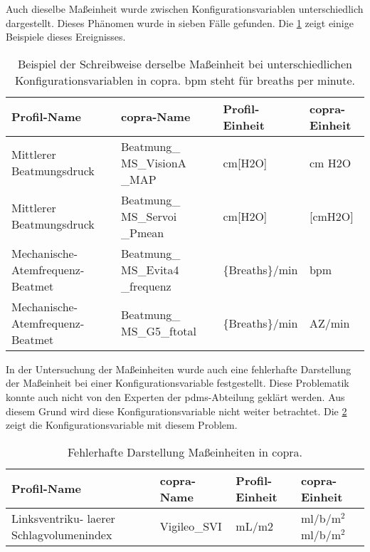 Auch dieselbe Maßeinheit wurde zwischen Konfigurationsvariablen unterschiedlich dargestellt. Dieses Phänomen wurde in sieben Fälle gefunden. Die \ref{tab:unitscopra} zeigt einige Beispiele dieses Ereignisses.

\clearpage

\begin{table}[ht]
	\centering
	\caption[Beispiel der Schreibweise derselbe Maßeinheit in \acs{copra}]{Beispiel der Schreibweise derselbe Maßeinheit bei unterschiedlichen Konfigurationsvariablen in \acs{copra}. bpm steht für \glqq breaths per minute\grqq{}.}
	\label{tab:unitscopra}
	\begin{tabular}{|p{3cm}|p{3cm}|l|l|} \hline
		\bfseries Profil-Name & \bfseries \ac{copra}-Name & \bfseries Profil-Einheit &  \bfseries \ac{copra}-Einheit \\ \hline
		Mittlerer Beatmungsdruck & Beatmung\_ MS\_VisionA \_MAP & cm[H2O] & cm H2O \\ \hline
		Mittlerer Beatmungsdruck & Beatmung\_ MS\_Servoi \_Pmean & cm[H2O] & [cmH2O] \\ \hline \hline
		Mechanische-Atemfrequenz-Beatmet & Beatmung\_ MS\_Evita4 \_frequenz & \{Breaths\}/min & bpm \\ \hline
		Mechanische-Atemfrequenz-Beatmet & Beatmung\_ MS\_G5\_ftotal & \{Breaths\}/min & AZ/min \\ \hline
	\end{tabular}
\end{table}

In der Untersuchung der Maßeinheiten wurde auch eine fehlerhafte Darstellung der Maßeinheit bei einer Konfigurationsvariable festgestellt. Diese Problematik konnte auch nicht von den Experten der \ac{pdms}-Abteilung geklärt werden. Aus diesem Grund wird diese Konfigurationsvariable nicht weiter betrachtet. Die \ref{tab:errounit} zeigt die Konfigurationsvariable mit diesem Problem.


\begin{table}[ht]
	\centering
	\caption[Fehlerhafte Darstellung Maßeinheiten in \acs{copra}]{Fehlerhafte Darstellung Maßeinheiten in \acs{copra}.}
	\label{tab:errounit}
	\begin{tabular}{|p{3cm}|p{3cm}|l|l|} \hline
		\bfseries Profil-Name & \bfseries \ac{copra}-Name & \bfseries Profil-Einheit & \bfseries \ac{copra}-Einheit \\ \hline
		Linksventriku- laerer Schlagvolumenindex & Vigileo\_SVI & mL/m2 & ml/b/m$^2$ml/b/m$^2$ \\ \hline
	\end{tabular}
\end{table}


